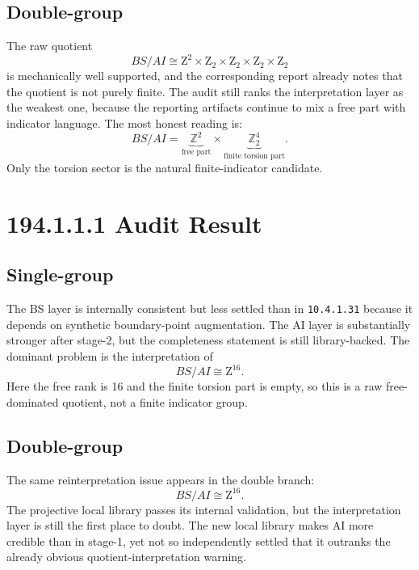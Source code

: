 \documentclass[11pt]{article}
\begin{document}
\subsection*{Double-group}
The raw quotient
\[
  BS/AI \cong \mathrm{Z}^{2} \times \mathrm{Z}_{2} \times \mathrm{Z}_{2} \times \mathrm{Z}_{2} \times \mathrm{Z}_{2}
\]
is mechanically well supported, and the corresponding report already notes that the quotient is not purely finite. The audit still ranks the interpretation layer as the weakest one, because the reporting artifacts continue to mix a free part with indicator language. The most honest reading is:
\[
  BS/AI = \underbrace{\mathbb{Z}^2}_{\text{free part}}
  \times
  \underbrace{\mathbb{Z}_2^4}_{\text{finite torsion part}}.
\]
Only the torsion sector is the natural finite-indicator candidate.

\section{194.1.1.1 Audit Result}
\subsection*{Single-group}
The BS layer is internally consistent but less settled than in \texttt{10.4.1.31} because it depends on synthetic boundary-point augmentation. The AI layer is substantially stronger after stage-2, but the completeness statement is still library-backed. The dominant problem is the interpretation of
\[
  BS/AI \cong \mathrm{Z}^{16}.
\]
Here the free rank is 16 and the finite torsion part is empty, so this is a raw free-dominated quotient, not a finite indicator group.

\subsection*{Double-group}
The same reinterpretation issue appears in the double branch:
\[
  BS/AI \cong \mathrm{Z}^{16}.
\]
The projective local library passes its internal validation, but the interpretation layer is still the first place to doubt. The new local library makes AI more credible than in stage-1, yet not so independently settled that it outranks the already obvious quotient-interpretation warning.
\end{document}

